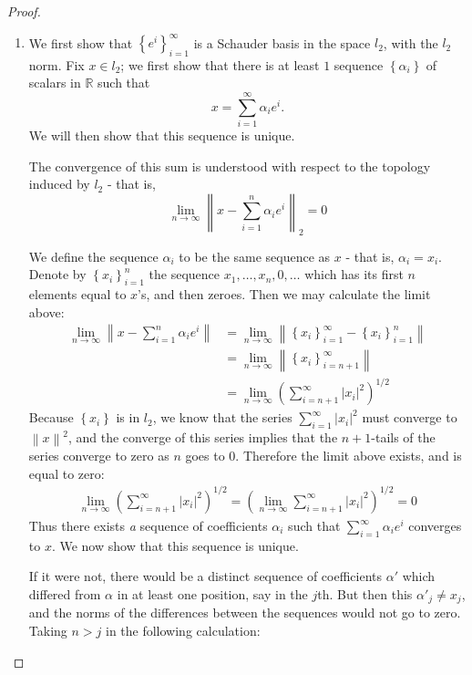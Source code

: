 \documentclass[12pt]{article}
\newcommand{\R}{\mathbb{R}}
\theoremstyle{definition}
\begin{document}
\begin{proof}
	\begin{enumerate}[label=(\roman*)]
		\item  We first show that $\left\{ e^i \right\}_{i=1}^\infty$ is a Schauder basis in the space $l_2$, with the $l_2$ norm. Fix $x \in l_2$; we first show that there is at least $1$ sequence $\left\{ \alpha_i \right\}$ of scalars in $\R$ such that 
			\[ x = \sum_{i=1}^\infty \alpha_i e^i.\]
		We will then show that this sequence is unique.
		\par The convergence of this sum is understood with respect to the topology induced by $l_2$ - that is, 
		\[\lim_{n\to\infty}  \left \lVert x -  \sum_{i=1}^n \alpha_i e^i \right \rVert_2 = 0\]
		\par We define the sequence $\alpha_i$ to be the same sequence as $x$ - that is, $\alpha_i = x_i$. Denote by $\left\{ x_i \right\}_{i=1}^n$ the sequence $x_1, \dots, x_n, 0, \dots$ which has its first $n$ elements equal to $x$'s, and then zeroes. Then we may calculate the limit above:
		\begin{align*}
			\lim_{n\to \infty} \left \lVert { x - \sum_{i=1}^n \alpha_i e^i } \right \lVert &= \lim_{n \to \infty}\left \lVert { \left\{ x_i \right\}_{i=1}^\infty - \left\{ x_i \right\}_{i=1}^n } \right \lVert \\
			&= \lim_{n\to \infty} \left \lVert \left\{ {x_i }\right\}_{i=n+1}^\infty  \right \lVert \\
			&= \lim_{n\to \infty} \left( \sum_{i=n+1}^\infty \left \lvert { x_i } \right \lvert ^2\right)^{1/2}
		\end{align*}
		Because $\left\{ x_i \right\}$ is in $l_2$, we know that the series $\sum_{i=1}^\infty \left \lvert { x_i } \right \lvert^2$ must converge to $\left \lVert { x } \right \lVert ^2$, and the converge of this series implies that the $n+1$-tails of the series converge to zero as $n$ goes to $0$. Therefore the limit above exists, and is equal to zero:
		\begin{align*}
		\lim_{n \to \infty} \left( \sum_{i=n+1}^\infty \left \lvert { x_i } \right \lvert ^2 \right)^{1/2} = \left( \lim_{n\to\infty} \sum_{i=n+1}^\infty \left \lvert { x_i } \right \lvert ^2 \right)^{1/2} = 0
		\end{align*}
		Thus there exists \textit{a} sequence of coefficients $\alpha_i$ such that $\sum_{i=1}^\infty \alpha_i e^i$ converges to $x$. We now show that this sequence is unique.
		\par If it were not, there would be a distinct sequence of coefficients $\alpha'$ which differed from $\alpha$ in at least one position, say in the $j$th. But then this $\alpha'_j \neq x_j$, and the norms of the differences between the sequences would not go to zero. Taking $n > j$ in the following calculation:

\end{enumerate}
\end{proof}
\end{document}
